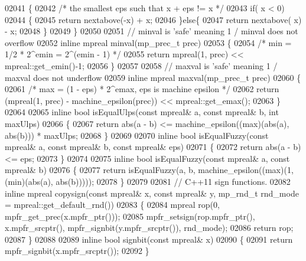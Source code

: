 \begin{DoxyCode}
{{02041 \{
02042     \textcolor{comment}{/* the smallest eps such that x + eps != x */}
02043     \textcolor{keywordflow}{if}( x < 0)
02044     \{
02045         \textcolor{keywordflow}{return} nextabove(-x) + x;
02046     \}\textcolor{keywordflow}{else}\{
02047         \textcolor{keywordflow}{return} nextabove( x) - x;
02048     \}
02049 \}
02050 
02051 \textcolor{comment}{// minval is 'safe' meaning 1 / minval does not overflow}
02052 \textcolor{keyword}{inline} mpreal minval(mp\_prec\_t prec)
02053 \{
02054     \textcolor{comment}{/* min = 1/2 * 2^emin = 2^(emin - 1) */}
02055     \textcolor{keywordflow}{return} mpreal(1, prec) << mpreal::get\_emin()-1;
02056 \}
02057 
02058 \textcolor{comment}{// maxval is 'safe' meaning 1 / maxval does not underflow}
02059 \textcolor{keyword}{inline} mpreal maxval(mp\_prec\_t prec)
02060 \{
02061     \textcolor{comment}{/* max = (1 - eps) * 2^emax, eps is machine epsilon */}
02062     \textcolor{keywordflow}{return} (mpreal(1, prec) - machine\_epsilon(prec)) << mpreal::get\_emax();
02063 \}
02064 
02065 \textcolor{keyword}{inline} \textcolor{keywordtype}{bool} isEqualUlps(\textcolor{keyword}{const} mpreal& a, \textcolor{keyword}{const} mpreal& b, \textcolor{keywordtype}{int} maxUlps)
02066 \{
02067     \textcolor{keywordflow}{return} abs(a - b) <= machine\_epsilon((max)(abs(a), abs(b))) * maxUlps;
02068 \}
02069 
02070 \textcolor{keyword}{inline} \textcolor{keywordtype}{bool} isEqualFuzzy(\textcolor{keyword}{const} mpreal& a, \textcolor{keyword}{const} mpreal& b, \textcolor{keyword}{const} mpreal& eps)
02071 \{
02072     \textcolor{keywordflow}{return} abs(a - b) <= eps;
02073 \}
02074 
02075 \textcolor{keyword}{inline} \textcolor{keywordtype}{bool} isEqualFuzzy(\textcolor{keyword}{const} mpreal& a, \textcolor{keyword}{const} mpreal& b)
02076 \{
02077     \textcolor{keywordflow}{return} isEqualFuzzy(a, b, machine\_epsilon((max)(1, (min)(abs(a), abs(b)))));
02078 \}
02079 
02081 \textcolor{comment}{// C++11 sign functions.}
02082 \textcolor{keyword}{inline} mpreal copysign(\textcolor{keyword}{const} mpreal& x, \textcolor{keyword}{const}  mpreal& y, mp\_rnd\_t rnd\_mode = mpreal::get\_default\_rnd())
02083 \{
02084     mpreal rop(0, mpfr\_get\_prec(x.mpfr\_ptr()));
02085     mpfr\_setsign(rop.mpfr\_ptr(), x.mpfr\_srcptr(), mpfr\_signbit(y.mpfr\_srcptr()), rnd\_mode);
02086     \textcolor{keywordflow}{return} rop;
02087 \}
02088 
02089 \textcolor{keyword}{inline} \textcolor{keywordtype}{bool} signbit(\textcolor{keyword}{const} mpreal& x)
02090 \{
02091     \textcolor{keywordflow}{return} mpfr\_signbit(x.mpfr\_srcptr());
02092 \}
}}
\end{DoxyCode}
